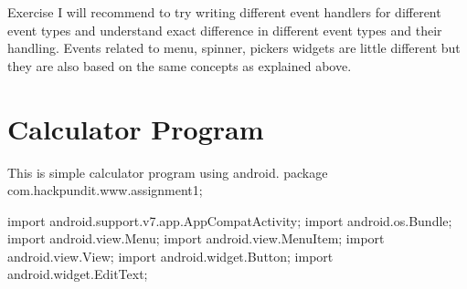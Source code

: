 \documentclass{fisatproject}
\begin{document}
Exercise
I will recommend to try writing different event handlers for different event types and understand exact difference in different event types and their handling. Events related to menu, spinner, pickers widgets are little different but they are also based on the same concepts as explained above.
\section{Calculator Program}
This is simple calculator program using android.
package com.hackpundit.www.assignment1;
 
 
 
import android.support.v7.app.AppCompatActivity;
import android.os.Bundle;
import android.view.Menu;
import android.view.MenuItem;
import android.view.View;
import android.widget.Button;
import android.widget.EditText;
 
\end{document}

